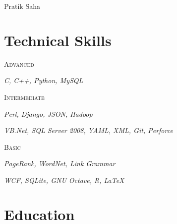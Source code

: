 \documentclass[]{article}
\begin{document}
{\selectfont\Large Pratik Saha}

{\Mobilefone}\hspace{4pt}{webversion}

{}

{\Mundus}

\section{Technical Skills}
{\raggedright\textsc{Advanced} } \hfill {\raggedleft\textit{C, C++, Python, MySQL}}

{\raggedright\textsc{Intermediate}} \hfill {\raggedleft\textit{Perl, Django, JSON, Hadoop}}

\hfill {\raggedleft\textit{VB.Net, SQL Server 2008, YAML, XML, Git, Perforce}}

{\raggedright\textsc{Basic}} \hfill {\raggedleft\textit{PageRank, WordNet, Link Grammar}}

\hfill {\raggedleft\textit{WCF, SQLite, GNU Octave, R, \LaTeX }}

\section{Education}
\end{document}
